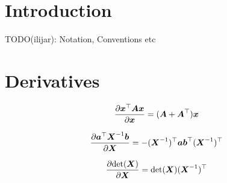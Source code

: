 \documentclass{article}
\title{\doctitle}
\author{\docauthor}
\begin{document}
\maketitle

\section{Introduction}
TODO(ilijar): Notation, Conventions etc

\section{Derivatives}

\begin{align}
  \frac{\partial {\boldsymbol{{x}}}^\top {\boldsymbol{{A}}} {\boldsymbol{{x}}}}{\partial {\boldsymbol{{x}}}}
    = ({\boldsymbol{{A}}} + {\boldsymbol{{A}}}^\top) {\boldsymbol{{x}}}
\end{align}

\begin{align}
  \frac{\partial {\boldsymbol{{a}}}^\top {\boldsymbol{{X}}}^{-1} {\boldsymbol{{b}}}}{\partial {\boldsymbol{{X}}}}
    = - ({\boldsymbol{{X}}}^{-1})^\top {\boldsymbol{{a}}} {\boldsymbol{{b}}}^\top ({\boldsymbol{{X}}}^{-1})^\top
\end{align}

\begin{align}
  \frac{\partial \mathrm{det}({\boldsymbol{{X}}})}{\partial {\boldsymbol{{X}}}}
    = \mathrm{det}({\boldsymbol{{X}}}) ({\boldsymbol{{X}}}^{-1})^\top
\end{align}
\end{document}
